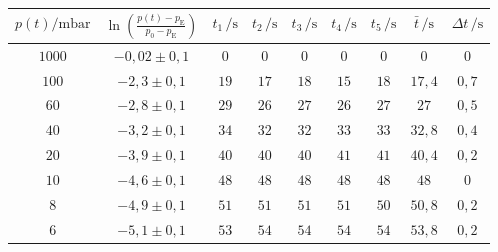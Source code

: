 \begin{table}
	\begin{center}
		\begin{tabular}{cc|ccccc|cc}
			\toprule
			{$p(t) /\mathrm{mbar}$} & {$\ln \left(\frac{p(t) - p_\text{E}}{p_0 - p_\text{E}}\right)$} & {$t_1\, /\mathrm{s}$} & {$t_2\, /\mathrm{s}$} & {$t_3\, /\mathrm{s}$} & {$t_4\, /\mathrm{s}$} & {$t_5\, /\mathrm{s}$} & {$\bar{t}\, /\mathrm{s}$} & {$\Delta t\, /\mathrm{s}$} \\ \midrule
			$1000$          &                  $-0,02 \pm 0,1$                   &          $0$          &          $0$          &          $0$          &          $0$          &          $0$          &            $0$            &            $0$             \\
			$100$          &                   $-2,3\pm 0,1$                    &         $19$          &         $17$          &         $18$          &         $15$          &         $18$          &          $17,4$           &           $0,7$            \\
			$60$           &                   $-2,8\pm 0,1$                    &         $29$          &         $26$          &         $27$          &         $26$          &         $27$          &           $27$            &           $0,5$            \\
			$40$           &                   $-3,2\pm 0,1$                    &         $34$          &         $32$          &         $32$          &         $33$          &         $33$          &          $32,8$           &           $0,4$            \\
			$20$           &                   $-3,9\pm 0,1$                    &         $40$          &         $40$          &         $40$          &         $41$          &         $41$          &          $40,4$           &           $0,2$            \\
			$10$           &                   $-4,6\pm 0,1$                    &         $48$          &         $48$          &         $48$          &         $48$          &         $48$          &           $48$            &            $0$             \\
			$8$           &                   $-4,9\pm 0,1$                    &         $51$          &         $51$          &         $51$          &         $51$          &         $50$          &          $50,8$           &           $0,2$            \\
			$6$           &                   $-5,1\pm 0,1$                    &         $53$          &         $54$          &         $54$          &         $54$          &         $54$          &          $53,8$           &           $0,2$            \\

\end{tabular}
\end{center}
\end{table}
